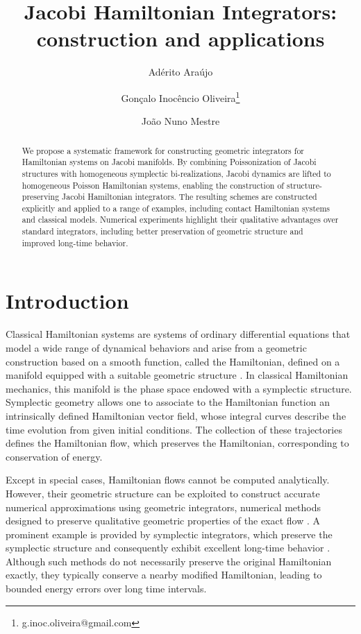 \documentclass[12pt,english]{article}
\title{Jacobi Hamiltonian Integrators: construction and applications}
\author{Ad\'erito Ara\'ujo}
\author{Gon\c calo Inoc\^encio Oliveira\thanks{g.inoc.oliveira@gmail.com}}
\author{Jo\~ao Nuno Mestre}
\affil{CMUC, University of Coimbra, Department of Mathematics, Portugal.}
\date{}
\begin{document}
	
\maketitle
\begin{abstract}
We propose a systematic framework for constructing geometric integrators for Hamiltonian systems on Jacobi manifolds. By combining Poissonization of Jacobi structures with homogeneous symplectic bi-realizations, Jacobi dynamics are lifted to homogeneous Poisson Hamiltonian systems, enabling the construction of structure-preserving Jacobi Hamiltonian integrators. The resulting schemes are constructed explicitly and applied to a range of examples, including contact Hamiltonian systems and classical models. Numerical experiments highlight their qualitative advantages over standard integrators, including better preservation of geometric structure and improved long-time behavior.
\end{abstract}

\section{Introduction}

Classical Hamiltonian systems are systems of ordinary differential equations that model a wide range of dynamical behaviors and arise from a geometric construction based on a smooth function, called the Hamiltonian, defined on a manifold equipped with a suitable geometric structure \cite{dwivedi2019hamiltonian,libermann1987symplectic}. In classical Hamiltonian mechanics, this manifold is the phase space endowed with a symplectic structure. Symplectic geometry allows one to associate to the Hamiltonian function an intrinsically defined Hamiltonian vector field, whose integral curves describe the time evolution from given initial conditions. The collection of these trajectories defines the Hamiltonian flow, which preserves the Hamiltonian, corresponding to conservation of energy.

Except in special cases, Hamiltonian flows cannot be computed analytically. However, their geometric structure can be exploited to construct accurate numerical approximations using geometric integrators, numerical methods designed to preserve qualitative geometric properties of the exact flow \cite{Hairer2006N}. A prominent example is provided by symplectic integrators, which preserve the symplectic structure and consequently exhibit excellent long-time behavior \cite{sanz1994numerical}. Although such methods do not necessarily preserve the original Hamiltonian exactly, they typically conserve a nearby modified Hamiltonian, leading to bounded energy errors over long time intervals.
\end{document}
